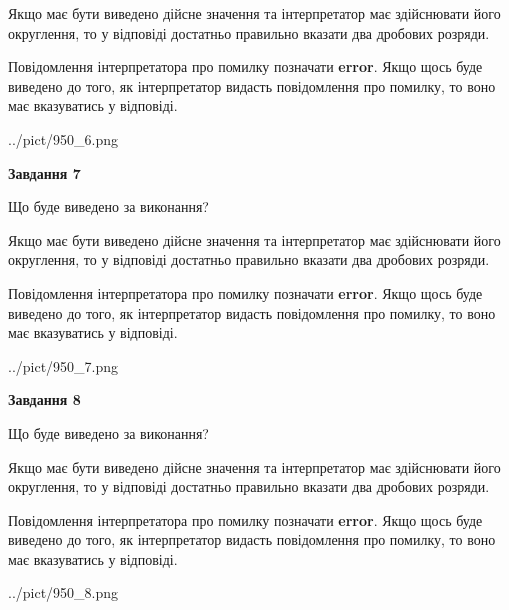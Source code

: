 \documentclass[12pt, ukrainian]{article}
\begin{document}
{\begin {Large}
Якщо має бути виведено дійсне значення та інтерпретатор має здійснювати його округлення, 
то у відповіді достатньо правильно вказати два дробових розряди.

Повідомлення інтерпретатора про помилку позначати \textbf{error}.
Якщо щось буде виведено до того, як інтерпретатор видасть повідомлення про помилку, 
то воно має вказуватись у відповіді. \par

\begin{center}
	{../pict/950_6.png}
\end{center}
\newpage

{\begin {center}\textbf{Завдання 7}\end {center}}\par
Що буде виведено за виконання? \par

Якщо має бути виведено дійсне значення та інтерпретатор має здійснювати його округлення, 
то у відповіді достатньо правильно вказати два дробових розряди.

Повідомлення інтерпретатора про помилку позначати \textbf{error}.
Якщо щось буде виведено до того, як інтерпретатор видасть повідомлення про помилку, 
то воно має вказуватись у відповіді. \par

\begin{center}
	{../pict/950_7.png}
\end{center}
\newpage

{\begin {center}\textbf{Завдання 8}\end {center}}\par
Що буде виведено за виконання? \par

Якщо має бути виведено дійсне значення та інтерпретатор має здійснювати його округлення, 
то у відповіді достатньо правильно вказати два дробових розряди.

Повідомлення інтерпретатора про помилку позначати \textbf{error}.
Якщо щось буде виведено до того, як інтерпретатор видасть повідомлення про помилку, 
то воно має вказуватись у відповіді. \par

\begin{center}
	{../pict/950_8.png}
\end{center}
\newpage


\end{Large}}
\end{document}
